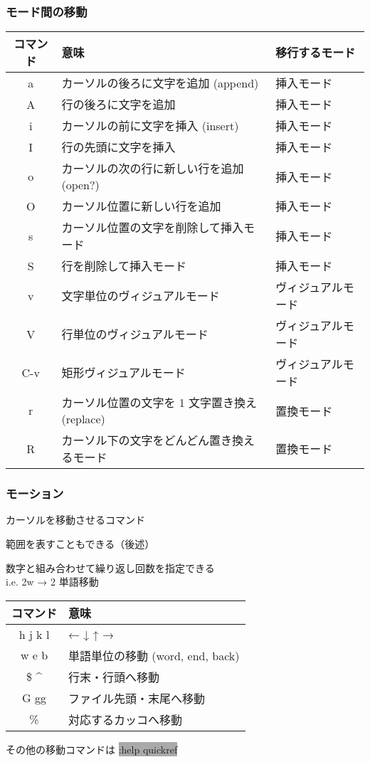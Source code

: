 \documentclass[unicode,aspectratio=1610,colorlinks,handout]{beamer}
\newcommand{\typecommand}[1]{\colorbox{darkgray}{{\ttfamily\color{lime}#1}}}
\begin{document}
\begin{frame}
	\frametitle{モード間の移動}
	\begin{center}
		\begin{tabular}{cll}
			コマンド&意味&移行するモード\\
			\hline
			a&カーソルの後ろに文字を追加 (append)&挿入モード\\
			A&行の後ろに文字を追加&挿入モード\\
			i&カーソルの前に文字を挿入 (insert)&挿入モード\\
			I&行の先頭に文字を挿入&挿入モード\\
			o&カーソルの次の行に新しい行を追加 (open?)&挿入モード\\
			O&カーソル位置に新しい行を追加&挿入モード\\
			s&カーソル位置の文字を削除して挿入モード&挿入モード\\
			S&行を削除して挿入モード&挿入モード\\
			v&文字単位のヴィジュアルモード&ヴィジュアルモード\\
			V&行単位のヴィジュアルモード&ヴィジュアルモード\\
			C-v&矩形ヴィジュアルモード&ヴィジュアルモード\\
			r&カーソル位置の文字を 1 文字置き換え (replace)&置換モード\\
			R&カーソル下の文字をどんどん置き換えるモード&置換モード\\
		\end{tabular}
	\end{center}
\end{frame}

\begin{frame}
	\frametitle{モーション}
	カーソルを移動させるコマンド
	
	範囲を表すこともできる（後述）
	
	数字と組み合わせて繰り返し回数を指定できる\\
	i.e. 2w → 2 単語移動
	
	\begin{center}
		\begin{tabular}{cl}
			コマンド&意味\\
			\hline
			h j k l&← ↓ ↑ →\\
			w e b&単語単位の移動 (word, end, back)\\
			\$ \textasciicircum&行末・行頭へ移動\\
			G gg&ファイル先頭・末尾へ移動\\
			\%&対応するカッコへ移動
		\end{tabular}
	\end{center}
	
	その他の移動コマンドは \typecommand{:help quickref}
\end{frame}
\end{document}
